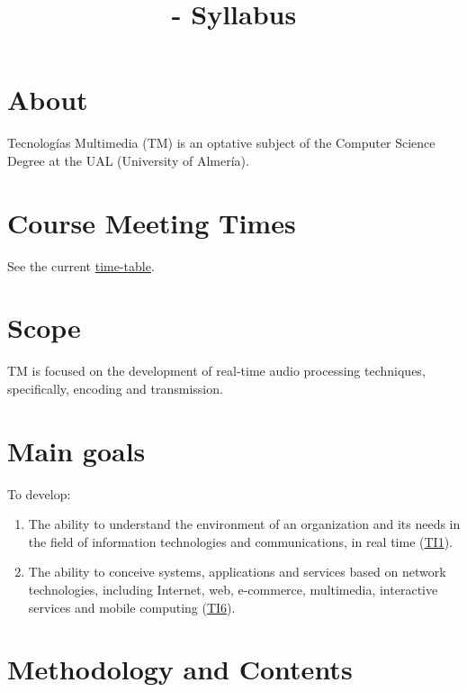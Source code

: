 

\title{\TM{} - Syllabus}

\maketitle

\section{About}

Tecnologías Multimedia (TM) is an optative subject of the Computer
Science Degree at the UAL (University of Almería).

\section{Course Meeting Times}

See the current \href{https://www.ual.es/estudios/grados/presentacion/plandeestudios/asignatura/4015/40154321}{time-table}.

\section{Scope}

TM is focused on the development of real-time audio processing
techniques, specifically, encoding and transmission.

\section{Main goals}

To develop:
\begin{enumerate}
\item The ability to understand the environment of an organization and
  its needs in the field of information technologies and
  communications, in real time
  (\href{https://www.ual.es/application/files/8516/5061/5446/memoriavig-ing-informatica-4015.pdf}{TI1}).
\item The ability to conceive systems, applications and services based
  on network technologies, including Internet, web, e-commerce,
  multimedia, interactive services and mobile computing
  (\href{https://www.ual.es/application/files/8516/5061/5446/memoriavig-ing-informatica-4015.pdf}{TI6}).
\end{enumerate}

\section{Methodology and Contents}

